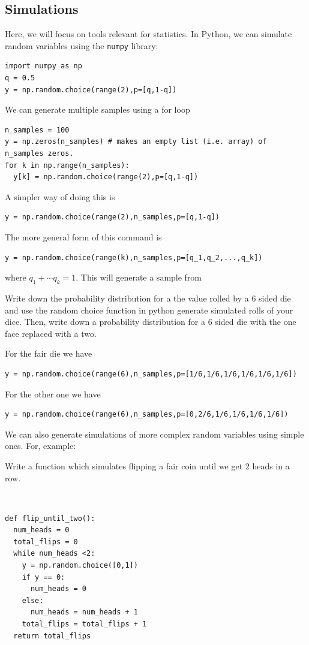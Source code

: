 \subsection{Simulations}
 Here, we will focus on tools relevant for statistics. In Python, we can simulate random variables using the \verb|numpy| library:
\begin{Verbatim}
import numpy as np
q = 0.5
y = np.random.choice(range(2),p=[q,1-q])
 \end{Verbatim}
 We can generate multiple samples using a for loop
\begin{Verbatim}
n_samples = 100
y = np.zeros(n_samples) # makes an empty list (i.e. array) of n_samples zeros.
for k in np.range(n_samples):
  y[k] = np.random.choice(range(2),p=[q,1-q])
 \end{Verbatim}
A simpler way of doing this is
\begin{Verbatim}
y = np.random.choice(range(2),n_samples,p=[q,1-q])
 \end{Verbatim}


  The more general form of this command is
\begin{Verbatim}
y = np.random.choice(range(k),n_samples,p=[q_1,q_2,...,q_k])
 \end{Verbatim}
 where $q_1 + \cdots q_k = 1$. This will generate a sample from



 \begin{exercise}
Write down the probability distribution for a the value rolled by a 6 sided die and use the random choice function in python generate simulated rolls of your dice. Then, write down a probability distribution for a $6$ sided die with the one face replaced with a two.
\end{exercise}
\begin{solution}
For the fair die we have
\begin{Verbatim}
y = np.random.choice(range(6),n_samples,p=[1/6,1/6,1/6,1/6,1/6,1/6])
\end{Verbatim}
For the other one we have
\begin{Verbatim}
y = np.random.choice(range(6),n_samples,p=[0,2/6,1/6,1/6,1/6,1/6])
\end{Verbatim}
\end{solution}

 We can also generate simulations of more complex random variables using simple ones. For, example:
 \begin{example}
Write a function which simulates flipping a fair coin until we get $2$ heads in a row.
\end{example}
\begin{solution}
\,
\begin{Verbatim}
def flip_until_two():
  num_heads = 0
  total_flips = 0
  while num_heads <2:
    y = np.random.choice([0,1])
    if y == 0:
      num_heads = 0
    else:
      num_heads = num_heads + 1
    total_flips = total_flips + 1
  return total_flips
 \end{Verbatim}
 \end{solution}



